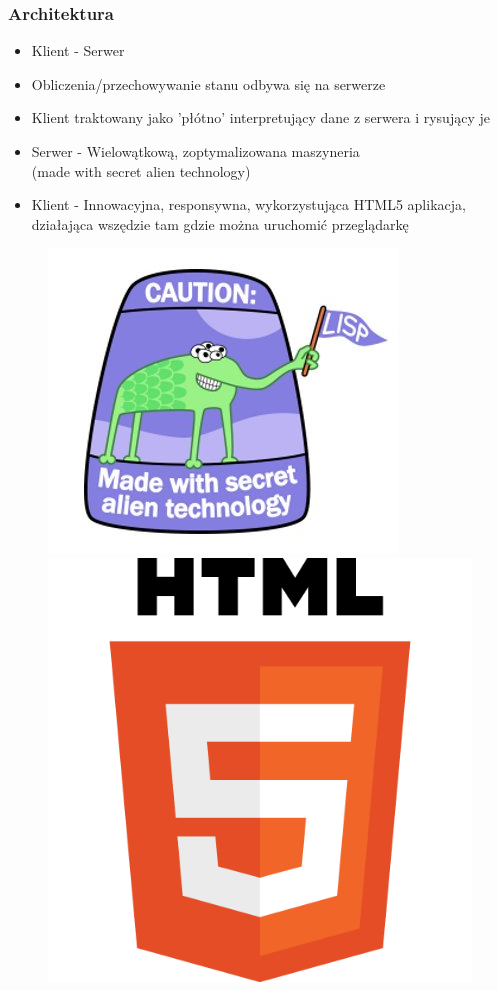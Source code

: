 \documentclass{beamer}
\begin{document}
\begin{frame}

\frametitle{Architektura}
\begin{itemize}
\item Klient - Serwer
\item Obliczenia/przechowywanie stanu odbywa się na serwerze
\item Klient traktowany jako 'płótno' interpretujący dane z serwera i rysujący je
\item Serwer - Wielowątkową, zoptymalizowana maszyneria \\
 (made with secret alien technology)
\item Klient - Innowacyjna, responsywna, wykorzystująca HTML5 aplikacja, działająca wszędzie
tam gdzie można uruchomić przeglądarkę
\end{itemize}

\begin{figure}
   \centering
      \includegraphics[scale=0.2]{lisp}
      \includegraphics[scale=0.125]{html5}
\end{figure}
\end{frame}
\end{document}
